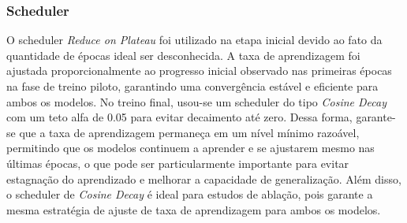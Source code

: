 \subsubsection{Scheduler}
O scheduler \textit{Reduce on Plateau} foi utilizado na etapa inicial devido ao fato da quantidade de épocas ideal ser desconhecida. A taxa de aprendizagem foi ajustada proporcionalmente ao progresso inicial observado nas primeiras épocas na fase de treino piloto, garantindo uma convergência estável e eficiente para ambos os modelos.
No treino final, usou-se um scheduler do tipo \textit{Cosine Decay} com um teto alfa de 0.05 para evitar decaimento até zero. Dessa forma, garante-se que a taxa de aprendizagem permaneça em um nível mínimo razoável, permitindo que os modelos continuem a aprender e se ajustarem mesmo nas últimas épocas, o que pode ser particularmente importante para evitar estagnação do aprendizado e melhorar a capacidade de generalização. Além disso, o scheduler de \textit{Cosine Decay} é ideal para estudos de ablação, pois garante a mesma estratégia de ajuste de taxa de aprendizagem para ambos os modelos.

